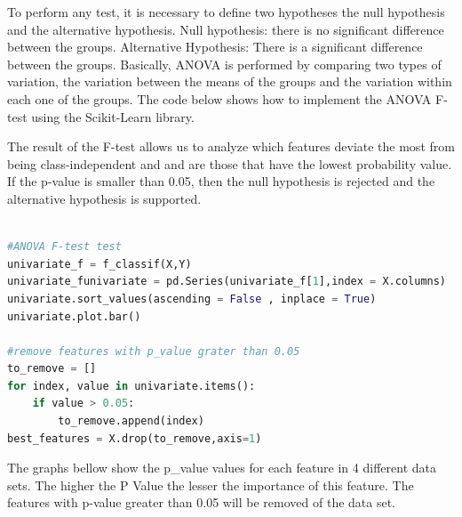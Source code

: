 To perform any test, it is necessary to define two hypotheses the null hypothesis and the alternative hypothesis. Null hypothesis: there is no significant difference between the groups. Alternative Hypothesis: There is a significant difference between the groups. Basically, ANOVA is performed by comparing two types of variation, the variation between the means of the groups and the variation within each one of the groups. The code below shows how to implement the ANOVA F-test using the Scikit-Learn library.

The result of the F-test allows us to analyze which features deviate the most from being class-independent and and are those that have the lowest probability value. If the p-value is smaller than 0.05, then the null hypothesis is rejected and the alternative hypothesis is supported.

\begin{lstlisting}[language=Python]

#ANOVA F-test test
univariate_f = f_classif(X,Y)
univariate_funivariate = pd.Series(univariate_f[1],index = X.columns)
univariate.sort_values(ascending = False , inplace = True)
univariate.plot.bar()

#remove features with p_value grater than 0.05
to_remove = []
for index, value in univariate.items():
    if value > 0.05:
        to_remove.append(index)
best_features = X.drop(to_remove,axis=1)
\end{lstlisting}

The graphs bellow show the p\_value values for each feature in 4 different data sets. The higher the P Value the lesser the importance of this feature. The features with p-value greater than 0.05 will be removed of the data set.

